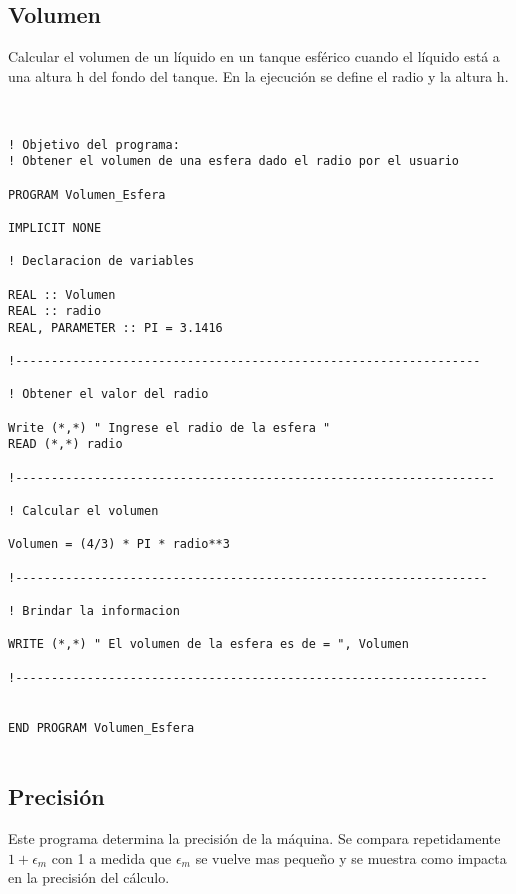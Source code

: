 \documentclass{article}
\begin{document}
\subsection*{Volumen}
Calcular el volumen de un l\'iquido en un tanque esf\'erico cuando el l\'iquido est\'a a una altura h del fondo del tanque. En la ejecuci\'on se define el radio y la altura h.\\ \\


\begin{Verbatim}[frame=single]

! Objetivo del programa:
! Obtener el volumen de una esfera dado el radio por el usuario

PROGRAM Volumen_Esfera

IMPLICIT NONE 

! Declaracion de variables

REAL :: Volumen
REAL :: radio
REAL, PARAMETER :: PI = 3.1416

!-----------------------------------------------------------------

! Obtener el valor del radio

Write (*,*) " Ingrese el radio de la esfera "
READ (*,*) radio

!-------------------------------------------------------------------

! Calcular el volumen

Volumen = (4/3) * PI * radio**3

!------------------------------------------------------------------

! Brindar la informacion

WRITE (*,*) " El volumen de la esfera es de = ", Volumen

!------------------------------------------------------------------


END PROGRAM Volumen_Esfera


\end{Verbatim}


\subsection*{Precisi\'on}
Este programa determina la precisi\'on de la m\'aquina. Se compara repetidamente $1 + \epsilon_m$ con 1 a medida que $\epsilon_m$ se vuelve mas peque\~no y se muestra como impacta en la precisi\'on del c\'alculo.\\ \\
	
\end{document}
